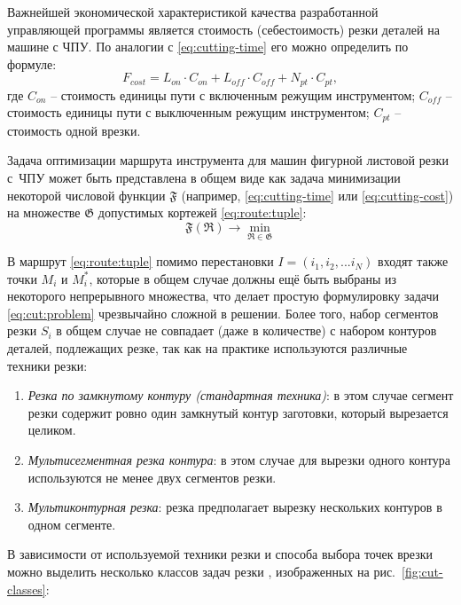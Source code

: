 Важнейшей экономической характеристикой качества
разработанной управляющей программы является стоимость
(себестоимость) резки деталей на машине с ЧПУ.
По аналогии с \eqref{eq:cutting-time}
его можно определить по формуле:
\begin{equation}
  F_{cost}=
  L_{on} \cdot C_{on} +
  L_{off} \cdot C_{off} +
  N_{pt} \cdot C_{pt}
  ,
  \label{eq:cutting-cost}
\end{equation}
где
$C_{on}$ -- стоимость единицы пути с включенным режущим инструментом;
$C_{off}$ -- стоимость единицы пути с выключенным режущим инструментом;
$C_{pt}$ -- стоимость одной врезки.

Задача оптимизации маршрута инструмента для машин фигурной листовой резки с~ЧПУ
может быть представлена в общем виде
как задача минимизации некоторой числовой функции
$\mathfrak F$
(например, \eqref{eq:cutting-time} или \eqref{eq:cutting-cost})
на множестве
$\mathfrak G$ допустимых кортежей
\eqref{eq:route:tuple}:
\begin{equation}
  \mathfrak F(\mathfrak R) \to \min_{\mathfrak R \in \mathfrak G}
  \label{eq:cut:problem}
\end{equation}

В маршрут \eqref{eq:route:tuple} помимо перестановки
$I = (i_1, i_2, ... i_N)$
входят также точки $M_i$ и $M_i^*$,
которые в общем случае должны ещё быть выбраны
из некоторого непрерывного множества,
что делает простую формулировку задачи \eqref{eq:cut:problem}
чрезвычайно сложной в решении.
Более того,
набор сегментов резки $S_i$
в общем случае не совпадает
(даже в количестве)
с набором контуров деталей,
подлежащих резке,
так как на практике используются различные техники резки:
\begin{enumerate}
  \item
  {\it Резка по замкнутому контуру (стандартная техника)}:
  в этом случае сегмент резки содержит
  ровно один замкнутый контур заготовки,
  который вырезается целиком.
  \item
  {\it Мультисегментная резка контура}:
  в этом случае для вырезки одного контура
  используются не менее двух сегментов резки.
  \item
  {\it Мультиконтурная резка}:
  резка предполагает вырезку нескольких
  контуров в одном сегменте.
\end{enumerate}

В зависимости от используемой техники резки и
способа выбора точек врезки можно выделить
несколько классов задач резки
\autocite[]{bi:dewil-review},
изображенных на рис.~\ref{fig:cut-classes}:

